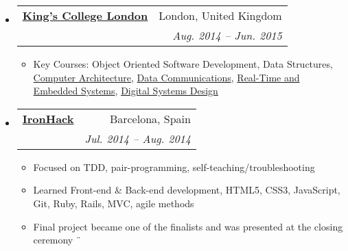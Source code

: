 \documentclass[letterpaper,11pt]{article}
\makeatletter
\newcommand{\resitem}[1]{\item #1 \vspace{-2pt}}
\newcommand{\ressubheading}[4]{
\begin{tabular*}{6.5in}{l@{\extracolsep{\fill}}r}
        \textbf{#1} & #2 \\
        \textit{#3} & \textit{#4} \\
\end{tabular*}\vspace{-6pt}}
\makeatother
\begin{document}
\begin{itemize}
{\begin{itemize}
                \end{itemize}
                }
        \item
        \ressubheading{\href{http://www.byui.edu}{King's College London}}{London, United Kingdom}{\href{http://www.byui.edu/csee/compe/default.htm}{Exchange Year (during third year)}; \href{http://www.ntnu.com/portfolio/unofficial_transcript.pdf}}{Aug. 2014 -- Jun. 2015}
            { \footnotesize
            \begin{itemize}
                \resitem{Key Courses: Object Oriented Software Development, Data Structures, \href{http://derekhildreth.com/portfolio/Resume/catalog/class.asp1045.htm}{Computer Architecture}, \href{http://derekhildreth.com/portfolio/Resume/catalog/class.asp1073.htm}{Data Communications}, \href{http://derekhildreth.com/portfolio/Resume/catalog/class.asp1072.htm}{Real-Time and Embedded Systems}, \href{http://derekhildreth.com/portfolio/Resume/catalog/class.asp1069.htm}{Digital Systems Design}}

            \end{itemize}
            }
        \item
        \ressubheading{\href{http://www.byui.edu}{IronHack}}{Barcelona, Spain}{\href{http://www.byui.edu/csee/compe/default.htm}{Intensive 8 week programming apprenticeship}; \href{http://www.ntnu.com/portfolio/unofficial_transcript.pdf}}{Jul. 2014 -- Aug. 2014}
            { \footnotesize
            \begin{itemize}
                \resitem{Focused on TDD, pair-programming, self-teaching/troubleshooting}
                \resitem{Learned Front-end \& Back-end development, HTML5, CSS3, JavaScript, Git, Ruby, Rails, MVC, agile methods}
                \resitem{Final project became one of the finalists and was presented at the closing ceremony}¨
            \end{itemize}
            }

    \end{itemize} %
\end{document}
